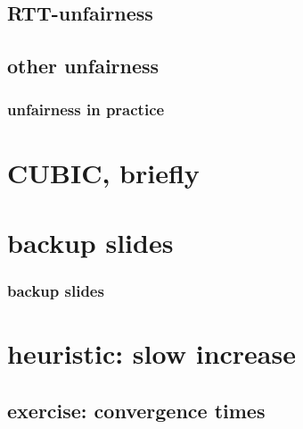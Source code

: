 \date{}
\title{}
\date{}

\begin{frame}
    \titlepage
\end{frame}

\subsection{RTT-unfairness}


\subsection{other unfairness}


\subsubsection{unfairness in practice}

\section{CUBIC, briefly}







\section{backup slides}
\begin{frame}\frametitle{backup slides}
\end{frame}
\section{heuristic: slow increase}


\subsection{exercise: convergence times}







